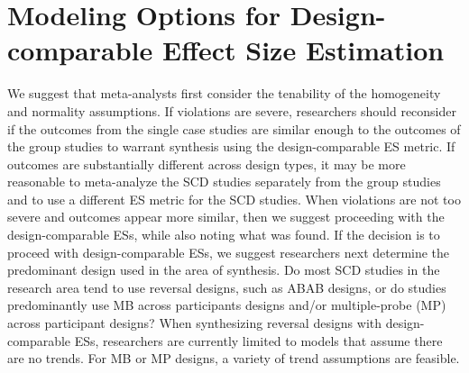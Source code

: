 \documentclass[
]{book}
\begin{document}
\hypertarget{modeling-options-for-design-comparable-effect-size-estimation}{%
\section{Modeling Options for Design-comparable Effect Size Estimation}\label{modeling-options-for-design-comparable-effect-size-estimation}}

We suggest that meta-analysts first consider the tenability of the homogeneity and normality assumptions. If violations are severe, researchers should reconsider if the outcomes from the single case studies are similar enough to the outcomes of the group studies to warrant synthesis using the design-comparable ES metric. If outcomes are substantially different across design types, it may be more reasonable to meta-analyze the SCD studies separately from the group studies and to use a different ES metric for the SCD studies. When violations are not too severe and outcomes appear more similar, then we suggest proceeding with the design-comparable ESs, while also noting what was found. If the decision is to proceed with design-comparable ESs, we suggest researchers next determine the predominant design used in the area of synthesis. Do most SCD studies in the research area tend to use reversal designs, such as ABAB designs, or do studies predominantly use MB across participants designs and/or multiple-probe (MP) across participant designs? When synthesizing reversal designs with design-comparable ESs, researchers are currently limited to models that assume there are no trends. For MB or MP designs, a variety of trend assumptions are feasible.
\end{document}
